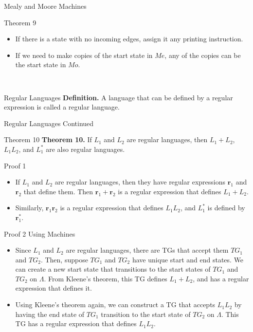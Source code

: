 \documentclass{article}
\begin{document}
\begin{multicols*}{3}
\begin{blackbox}{Mealy and Moore Machines}
\begin{redbox}{Theorem 9}
\begin{itemize}[leftmargin=5pt]
            \item If there is a state with no incoming edges, assign it any printing instruction.
            \item If we need to make copies of the start state in $Me$, any of the copies can be the start state in $Mo$.
        \end{itemize}
    \end{redbox}\\[-1ex]
\end{blackbox}
\begin{blackbox}{Regular Languages}
    \textbf{Definition.} A language that can be defined by a regular expression is called a regular language.
\end{blackbox}
\begin{blackbox}{Regular Languages Continued}
    \begin{brownbox}{Theorem 10}
        \textbf{Theorem 10.} If $L_1$ and $L_2$ are regular languages, then $L_1 + L_2$, $L_1L_2$, and $L_1^*$ are also regular languages.\\
        \begin{pinkbox}{Proof 1}
            \begin{itemize}[leftmargin=5pt]
                \item If $L_1$ and $L_2$ are regular languages, then they have regular expressions $\textbf{r}_1$ and $\textbf{r}_2$ that define them. Then $\textbf{r}_1 + \textbf{r}_2$ is a regular expression that defines $L_1 + L_2$.
                \item Similarly, $\textbf{r}_1\textbf{r}_2$ is a regular expression that defines $L_1L_2$, and $L_1^*$ is defined by $\textbf{r}_1^*$.
            \end{itemize}
        \end{pinkbox}
        \begin{redbox}{Proof 2 Using Machines}
            \begin{itemize}[leftmargin=5pt]
                \item Since $L_1$ and $L_2$ are regular languages, there are TGs that accept them $TG_1$ and $TG_2$. Then, suppose $TG_1$ and $TG_2$ have unique start and end states. We can create a new start state that transitions to the start states of $TG_1$ and $TG_2$ on $\Lambda$. From Kleene's theorem, this TG defines $L_1 + L_2$, and has a regular expression that defines it.
                \item Using Kleene's theorem again, we can construct a TG that accepts $L_1L_2$ by having the end state of $TG_1$ transition to the start state of $TG_2$ on $\Lambda$. This TG has a regular expression that defines $L_1L_2$.

\end{itemize}
\end{redbox}
\end{brownbox}
\end{blackbox}
\end{multicols*}
\end{document}
